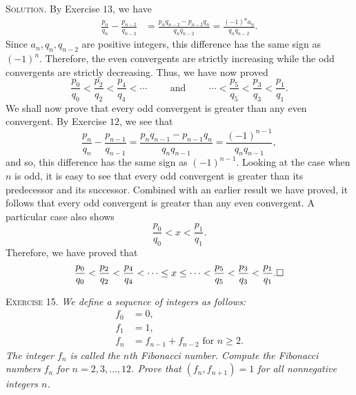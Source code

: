 \documentclass[11pt, leqno]{article}
\newcommand{\done}{\ensuremath{\hfill\square}}
\begin{document}
\textsc{Solution}. By Exercise $13$, we have 
\begin{align*}
\frac{p_n}{q_n} - \frac{p_{n-2}}{q_{n-2}} &= \frac{p_nq_{n-2} - p_{n-2}q_n}{q_nq_{n-2}} = \frac{(-1)^n a_n}{q_nq_{n-2}}.
\end{align*}
Since $a_n, q_n, q_{n-2}$ are positive integers, this difference has the same sign as $(-1)^n$. Therefore, the even convergents are strictly increasing while the odd convergents are strictly decreasing. Thus, we have now proved 
\begin{displaymath}
\frac{p_0}{q_0} < \frac{p_2}{q_2} < \frac{p_4}{q_4} < \cdots \hspace{1cm}\text{and}\hspace{1cm} \cdots < \frac{p_5}{q_5} < \frac{p_3}{q_3} < \frac{p_1}{q_1}.
\end{displaymath}
We shall now prove that every odd convergent is greater than any even convergent. By Exercise $12$, we see that 
\begin{displaymath}
\frac{p_n}{q_n} - \frac{p_{n-1}}{q_{n-1}} = \frac{p_nq_{n-1} - p_{n-1}q_n}{q_nq_{n-1}} = \frac{(-1)^{n-1}}{q_nq_{n-1}},
\end{displaymath}
and so, this difference has the same sign as $(-1)^{n-1}$. Looking at the case when $n$ is odd, it is easy to see that every odd convergent is greater than its predecessor and its successor. Combined with an earlier result we have proved, it follows that every odd convergent is greater than any even convergent. A particular case also shows 
\begin{displaymath}
\frac{p_0}{q_0} < x < \frac{p_1}{q_1}.
\end{displaymath}
Therefore, we have proved that 
\begin{displaymath}
\frac{p_0}{q_0} < \frac{p_2}{q_2} < \frac{p_4}{q_4} < \cdots \leq x \leq \cdots < \frac{p_5}{q_5} < \frac{p_3}{q_3} < \frac{p_1}{q_1}. \done
\end{displaymath}

\textsc{Exercise 15}. \emph{We define a sequence of integers as follows: 
\begin{align*}
  f_0 &= 0,\\
  f_1 &= 1,\\
  f_n &= f_{n-1} + f_{n-2} \text{ for } n\geq 2.
\end{align*}The integer $f_n$ is called the $n$th Fibonacci number. Compute the Fibonacci numbers $f_n$ for $n= 2,3,\ldots, 12$. Prove that $(f_n, f_{n+1}) = 1$ for all nonnegative integers $n$.}
\end{document}
